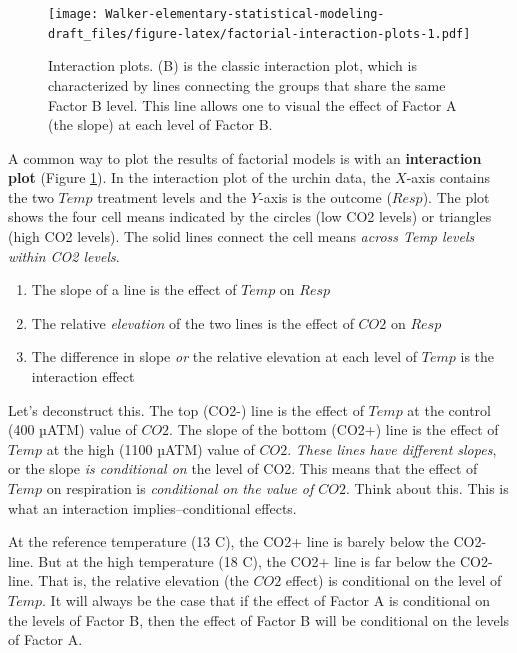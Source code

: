 \documentclass[]{book}
\providecommand{\tightlist}{%
  \setlength{\itemsep}{0pt}\setlength{\parskip}{0pt}}
\begin{document}
\begin{figure}
\centering
\texttt{[image: Walker-elementary-statistical-modeling-draft\_files/figure-latex/factorial-interaction-plots-1.pdf]}
\caption{\label{fig:factorial-interaction-plots}Interaction plots. (B) is the classic interaction plot, which is characterized by lines connecting the groups that share the same Factor B level. This line allows one to visual the effect of Factor A (the slope) at each level of Factor B.}
\end{figure}

A common way to plot the results of factorial models is with an \textbf{interaction plot} (Figure \ref{fig:factorial-interaction-plots}). In the interaction plot of the urchin data, the \(X\)-axis contains the two \(Temp\) treatment levels and the \(Y\)-axis is the outcome (\(Resp\)). The plot shows the four cell means indicated by the circles (low CO2 levels) or triangles (high CO2 levels). The solid lines connect the cell means \emph{across Temp levels within CO2 levels}.

\begin{enumerate}
\def\labelenumi{\arabic{enumi}.}
\tightlist
\item
  The slope of a line is the effect of \(Temp\) on \(Resp\)
\item
  The relative \emph{elevation} of the two lines is the effect of \(CO2\) on \(Resp\)
\item
  The difference in slope \emph{or} the relative elevation at each level of \(Temp\) is the interaction effect
\end{enumerate}

Let's deconstruct this. The top (CO2-) line is the effect of \(Temp\) at the control (400 µATM) value of \(CO2\). The slope of the bottom (CO2+) line is the effect of \(Temp\) at the high (1100 µATM) value of \(CO2\). \emph{These lines have different slopes}, or the slope \emph{is conditional on} the level of CO2. This means that the effect of \(Temp\) on respiration is \emph{conditional on the value of \(CO2\)}. Think about this. This is what an interaction implies--conditional effects.

At the reference temperature (13 C), the CO2+ line is barely below the CO2- line. But at the high temperature (18 C), the CO2+ line is far below the CO2- line. That is, the relative elevation (the \(CO2\) effect) is conditional on the level of \(Temp\). It will always be the case that if the effect of Factor A is conditional on the levels of Factor B, then the effect of Factor B will be conditional on the levels of Factor A.
\end{document}
